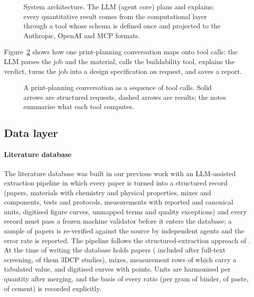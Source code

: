 \documentclass[preprint,12pt]{elsarticle}
\begin{document}
\begin{figure}[p]
\centering
\resizebox{\textwidth}{!}{}
\caption{System architecture. The LLM (agent core) plans and explains; every quantitative result comes from the computational layer through a tool whose schema is defined once and projected to the Anthropic, OpenAI and MCP formats.}
\label{fig:arch}
\end{figure}

Figure~\ref{fig:seq} shows how one print-planning conversation maps onto tool calls: the LLM parses the job and the material, calls the buildability tool, explains the verdict, turns the job into a design specification on request, and saves a report.

\begin{figure}[t]
\centering
\resizebox{\textwidth}{!}{}
\caption{A print-planning conversation as a sequence of tool calls. Solid arrows are structured requests, dashed arrows are results; the notes summarise what each tool computes.}
\label{fig:seq}
\end{figure}

\subsection{Data layer}

\paragraph{Literature database} The literature database was built in our previous work with an LLM-assisted extraction pipeline in which every paper is turned into a structured record (papers, materials with chemistry and physical properties, mixes and components, tests and protocols, measurements with reported and canonical units, digitised figure curves, unmapped terms and quality exceptions) and every record must pass a frozen machine validator before it enters the database; a sample of papers is re-verified against the source by independent agents and the error rate is reported. The pipeline follows the structured-extraction approach of \cite{dagdelen2024structured,polak2024extracting}. At the time of writing the database holds \npapers{} papers (\npapersIncluded{} included after full-text screening, \npapersThreeDCP{} of them 3DCP studies), \nmixes{} mixes, \nmeasurements{} measurement rows of which \nmeasurementsValued{} carry a tabulated value, and \ncurves{} digitised curves with \ncurvePoints{} points. Units are harmonised per quantity after merging, and the basis of every ratio (per gram of binder, of paste, of cement) is recorded explicitly.
\end{document}

